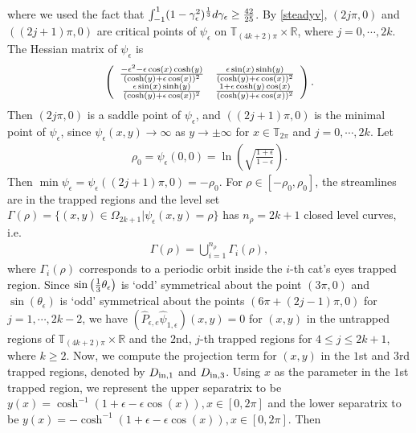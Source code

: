 \documentclass[1 [leqno, 11pt]{amsart}
\numberwithin{equation}{section}
\let\ep=\epsilon
\begin{document}
\begin{CJK*}{GBK}{song}
\begin{align}
\end{align}
where we used the fact that $\int_{-1}^1(1-\gamma_\ep^2)^{1\over3}d\gamma_\ep\geq {42\over 25}$.
By \eqref{steadyv}, $(2j\pi,0)$ and $((2j+1)\pi,0)$ are critical points of $\psi_\ep$  on $\mathbb{T}_{(4k+2)\pi}\times \mathbb{R}$, where $j=0,\cdots,2k$. The  Hessian matrix of $\psi_\ep$ is
\begin{align*}
\left( \begin{array}{cc} {-\ep^2-\ep\cos(x)\cosh(y)\over (\cosh(y)+\ep\cos(x))^2} & {\ep\sin(x)\sinh(y)\over (\cosh(y)+\ep\cos(x))^2} \\ {\ep\sin(x)\sinh(y)\over (\cosh(y)+\ep\cos(x))^2} & {1+\ep\cosh(y)\cos(x)\over (\cosh(y)+\ep\cos(x))^2} \end{array} \right).
\end{align*}
Then $(2j\pi,0)$ is a saddle point of $\psi_\ep$, and $((2j+1)\pi,0)$ is the minimal  point of $\psi_\ep$, since $\psi_\ep(x,y)\to\infty$ as $y\to \pm\infty$ for $x\in\mathbb{T}_{2\pi}$ and $j=0,\cdots,2k$.
Let
\begin{align}\label{def-rho0}
\rho_0 = \psi_\ep(0,0) = \ln\left(\sqrt{\frac{1+\ep}{1-\ep}}\right).
\end{align}
Then $\min \psi_\ep = \psi_\ep((2j+1)\pi, 0) = - \rho_0$.
For $\rho\in[-\rho_0, \rho_0]$, the streamlines are in the trapped regions and  the level set $\Gamma(\rho) = \{(x, y) \in \Omega_{2k+1} | \psi_\ep(x,y) = \rho\} $ has $n_\rho = 2k+1$ closed level curves, i.e.
\begin{align}\label{Gamma-rho}
\Gamma(\rho) =  \bigcup_{i=1}^{n_\rho} \Gamma_i(\rho),
\end{align}
 where $\Gamma_i(\rho)$ corresponds to a periodic orbit inside the $i$-th cat's eyes trapped region.
Since
$\sin\left({1\over 3}\theta_\ep\right)$ is  `odd'   symmetrical about the point $( 3\pi,0)$ and $\sin\left(\theta_\ep\right)$ is  `odd'   symmetrical about the points $( 6\pi+(2j-1)\pi,0)$ for $j=1,\cdots,2k-2$,  we have
$(\hat{P}_{\ep,e} \hat{\psi}_{1,\ep})(x,y)=0$ for $(x,y)$ in the untrapped regions of $\mathbb{T}_{(4k+2)\pi}\times \mathbb{R}$ and the $2$nd, $j$-th trapped regions for $4\leq j\leq 2k+1$, where $k\geq2$.
Now, we compute the projection term for $(x,y)$ in  the $1$st and $3$rd  trapped regions, denoted by $D_{\rm{in},1}$ and $D_{\rm{in},3}$.
Using $x$ as the parameter in the $1$st trapped region,
we  represent the upper  separatrix to be $y(x)=\cosh^{-1}(1+\ep-\ep\cos(x)), x\in[0,2\pi]$ and  the lower  separatrix to be $y(x)=-\cosh^{-1}(1+\ep-\ep\cos(x)), x\in[0,2\pi]$.
Then
\begin{align}\nonumber

\end{align}
\end{CJK*}
\end{document}
